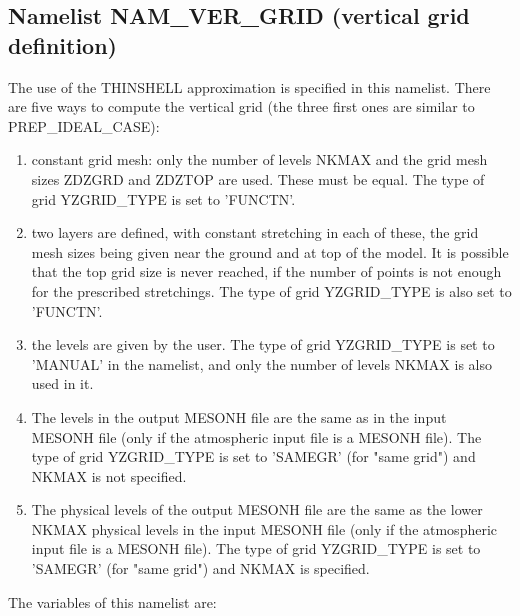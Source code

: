 \subsection{Namelist NAM\_VER\_GRID (vertical grid definition)}

The use of the THINSHELL approximation is specified in this namelist.
There are five ways to compute the vertical grid (the three first ones are
 similar to PREP\_IDEAL\_CASE):
\begin{enumerate}
\item
constant grid mesh: only the number of levels NKMAX and the grid mesh sizes 
ZDZGRD and ZDZTOP are used. These must be equal. The type of grid 
YZGRID\_TYPE is set to 'FUNCTN'.
\item
two layers are defined, with constant stretching in each of these, the grid
mesh sizes being given near the ground and at top of the model. It is possible
that the top grid size is never reached, if the number of points is not enough
for the prescribed stretchings. The type of grid 
YZGRID\_TYPE is also set to 'FUNCTN'.
\item
the levels are given by the user. The type of grid YZGRID\_TYPE is set to
'MANUAL' in the namelist, and only the number of levels NKMAX is also used in it. 
\item
The levels in the output MESONH file are the same as in the input MESONH file 
(only if the atmospheric input file is a MESONH file).
The type of grid YZGRID\_TYPE is set to 'SAMEGR' (for "same grid") and
NKMAX is not specified.
\item 
The physical levels of the output MESONH file are the same as 
the lower NKMAX physical levels in the input MESONH file 
(only if the atmospheric input file is a MESONH file).
The type of grid YZGRID\_TYPE is set to 'SAMEGR' (for "same grid") and NKMAX
is specified.
\end{enumerate}

The variables of this namelist are:

